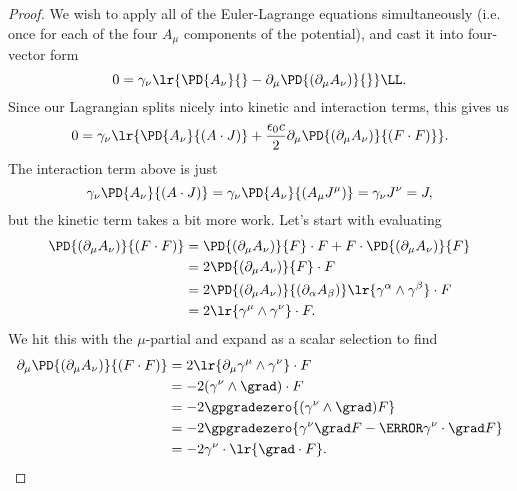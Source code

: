 \begin{proof}
We wish to apply all of the Euler-Lagrange equations simultaneously (i.e. once for each of the four \(A_\mu\) components of the potential), and cast it into four-vector form
\begin{equation}\label{eqn:maxwells:140}
0 = \gamma_\nu \lr{ \PD{A_\nu}{} - \partial_\mu \PD{(\partial_\mu A_\nu)}{} } \LL.
\end{equation}
Since our Lagrangian splits nicely into kinetic and interaction terms, this gives us
\begin{equation}\label{eqn:maxwells:160}
   0 = \gamma_\nu \lr{ \PD{A_\nu}{(A \cdot J)} + \frac{\epsilon_0 c}{2} \partial_\mu \PD{(\partial_\mu A_\nu)}{ (F \cdot F)} }.
\end{equation}
The interaction term above is just
\begin{equation}\label{eqn:maxwells:180}
   \gamma_\nu \PD{A_\nu}{(A \cdot J)}
=
\gamma_\nu \PD{A_\nu}{(A_\mu J^\mu)}
=
\gamma_\nu J^\nu
=
J,
\end{equation}
but the kinetic term takes a bit more work.  Let's start with evaluating
\begin{equation}\label{eqn:maxwells:200}
\begin{aligned}
   \PD{(\partial_\mu A_\nu)}{ (F \cdot F)}
   &=
\PD{(\partial_\mu A_\nu)}{ F } \cdot F
+
F \cdot \PD{(\partial_\mu A_\nu)}{ F } \\
&=
2 \PD{(\partial_\mu A_\nu)}{ F } \cdot F \\
&=
2 \PD{(\partial_\mu A_\nu)}{ (\partial_\alpha A_\beta) } \lr{ \gamma^\alpha \wedge \gamma^\beta } \cdot F \\
&=
2 \lr{ \gamma^\mu \wedge \gamma^\nu } \cdot F.
\end{aligned}
\end{equation}
We hit this with the \(\mu\)-partial and expand as a scalar selection to find
\begin{equation}\label{eqn:maxwells:220}
\begin{aligned}
   \partial_\mu \PD{(\partial_\mu A_\nu)}{ (F \cdot F)}
   &=
2 \lr{ \partial_\mu \gamma^\mu \wedge \gamma^\nu } \cdot F \\
&=
- 2 (\gamma^\nu \wedge \grad) \cdot F \\
&=
- 2 \gpgradezero{ (\gamma^\nu \wedge \grad) F } \\
&=
- 2 \gpgradezero{ \gamma^\nu \grad F - \cancel{ \gamma^\nu \cdot \grad F } } \\
&=
- 2 \gamma^\nu \cdot \lr{ \grad \cdot F }.
\end{aligned}

\end{equation}
\end{proof}
